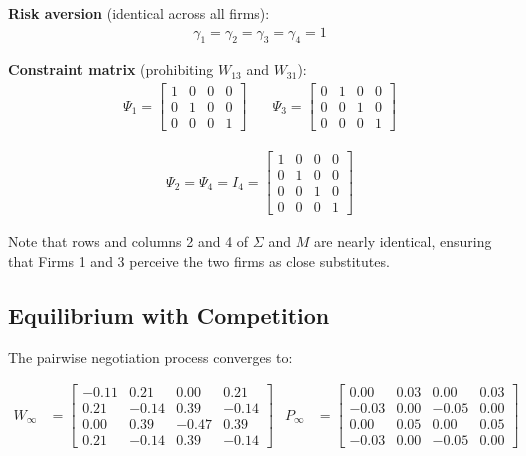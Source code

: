 \textbf{Risk aversion} (identical across all firms):
\begin{align} \label{eq:gamma_4}
    \gamma_1 = \gamma_2 = \gamma_3 = \gamma_4 = 1
\end{align}

\textbf{Constraint matrix} (prohibiting $W_{13}$ and $W_{31}$):
\begin{align} \label{eq:psi_4}
\Psi_1 =
\begin{bmatrix}
    1 & 0 & 0 & 0 \\
    0 & 1 & 0 & 0 \\
    0 & 0 & 0 & 1
\end{bmatrix} & \quad
\Psi_3 =
\begin{bmatrix}
    0 & 1 & 0 & 0 \\
    0 & 0 & 1 & 0 \\
    0 & 0 & 0 & 1
\end{bmatrix}
\end{align}


\begin{align} \label{eq:psi_2}
\Psi_2 = \Psi_4 = I_4=
\begin{bmatrix}
    1 & 0 & 0 & 0 \\
    0 & 1 & 0 & 0 \\
    0 & 0 & 1 & 0 \\
    0 & 0 & 0 & 1
\end{bmatrix} 
\end{align}

Note that rows and columns 2 and 4 of $\Sigma$ and $M$ are nearly identical, ensuring that Firms 1 and 3 perceive the two firms as close substitutes.

\subsection{Equilibrium with Competition}

The pairwise negotiation process converges to:

\begin{align} 
    W_\infty &= \begin{bmatrix} 
        -0.11 & 0.21 & 0.00 & 0.21 \\ 
        0.21 & -0.14 & 0.39 & -0.14\\ 
        0.00 & 0.39 & -0.47 & 0.39\\
        0.21 & -0.14 & 0.39 & -0.14
    \end{bmatrix} & 
    P_\infty &= \begin{bmatrix} 
        0.00 & 0.03 & 0.00 & 0.03 \\ 
        -0.03 & 0.00 & -0.05 & 0.00 \\ 
        0.00 & 0.05 & 0.00 & 0.05 \\
        -0.03 & 0.00 & -0.05 & 0.00
    \end{bmatrix}
\end{align}

